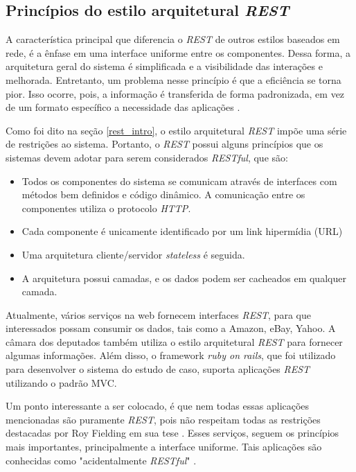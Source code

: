 \subsection{Princípios do estilo arquitetural \textit{REST}}

	A característica principal que diferencia o \textit{REST} de outros estilos baseados em rede, é a ênfase em uma interface uniforme entre os componentes. Dessa forma, a arquitetura geral do sistema é simplificada e a visibilidade das interações e melhorada. Entretanto, um problema nesse princípio é que a eficiência se torna pior. Isso ocorre, pois, a informação é transferida de forma padronizada, em vez de um formato específico a necessidade das aplicações \cite{fielding2000architectural}.
	
	Como foi dito na seção \ref{rest_intro}, o estilo arquitetural \textit{REST} impõe uma série de restrições ao sistema. Portanto, o \textit{REST} possui alguns princípios que os sistemas devem adotar para serem considerados \textit{RESTful}, que são: 

\begin{itemize}
	\item Todos os componentes do sistema se comunicam através de interfaces com métodos bem definidos e código dinâmico. A comunicação entre os componentes utiliza o protocolo \textit{HTTP}.
	\item Cada componente é unicamente identificado por um link hipermídia (URL)
	\item Uma arquitetura cliente/servidor \textit{stateless} é seguida.
	\item A arquitetura possui camadas, e os dados podem ser cacheados em qualquer camada.
\end{itemize}

	Atualmente, vários serviços na web fornecem interfaces \textit{REST}, para que interessados possam consumir os dados, tais como a Amazon, eBay, Yahoo. A câmara dos deputados também utiliza o estilo arquitetural \textit{REST} para fornecer algumas informações. Além disso, o framework \textit{ruby on rails}, que foi utilizado para desenvolver o sistema do estudo de caso, suporta aplicações \textit{REST} utilizando o padrão MVC.
	
	Um ponto interessante a ser colocado, é que nem todas essas aplicações mencionadas são puramente \textit{REST}, pois não respeitam todas as restrições destacadas por Roy Fielding em sua tese \cite{fielding2000architectural}. Esses serviços, seguem os princípios mais importantes, principalmente a interface uniforme. Tais aplicações são conhecidas como "acidentalmente \textit{RESTful}" \cite{acident-rest}.

